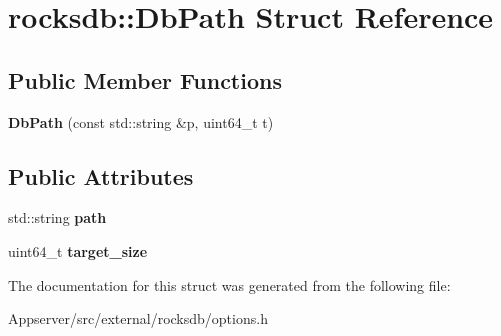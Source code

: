 \hypertarget{structrocksdb_1_1DbPath}{}\section{rocksdb\+:\+:Db\+Path Struct Reference}
\label{structrocksdb_1_1DbPath}
\subsection*{Public Member Functions}
\begin{DoxyCompactItemize}
\item 
{\bfseries Db\+Path} (const std\+::string \&p, uint64\+\_\+t t)\hypertarget{structrocksdb_1_1DbPath_a6e982ec78af59710f41c59bd06801a7c}{}\label{structrocksdb_1_1DbPath_a6e982ec78af59710f41c59bd06801a7c}

\end{DoxyCompactItemize}
\subsection*{Public Attributes}
\begin{DoxyCompactItemize}
\item 
std\+::string {\bfseries path}\hypertarget{structrocksdb_1_1DbPath_a010b8c715e856b33a9bc8351b096f62d}{}\label{structrocksdb_1_1DbPath_a010b8c715e856b33a9bc8351b096f62d}

\item 
uint64\+\_\+t {\bfseries target\+\_\+size}\hypertarget{structrocksdb_1_1DbPath_aaef4845c332e0fb7ee46ca8fc4917786}{}\label{structrocksdb_1_1DbPath_aaef4845c332e0fb7ee46ca8fc4917786}

\end{DoxyCompactItemize}


The documentation for this struct was generated from the following file\+:\begin{DoxyCompactItemize}
\item 
Appserver/src/external/rocksdb/options.\+h\end{DoxyCompactItemize}
